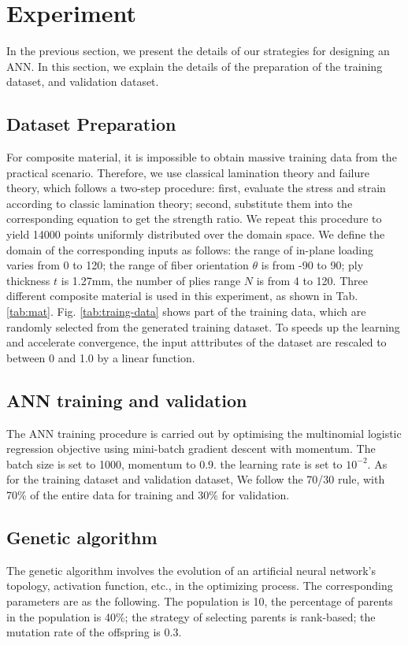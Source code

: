 \section{Experiment}
In the previous section, we present the details of our strategies for designing
an ANN. In this section, we explain the details of the preparation of the
training dataset, and validation dataset.
\subsection{Dataset Preparation}
For composite material, it is impossible to obtain massive training data from
the practical scenario. Therefore, we use classical lamination theory and
failure theory, which follows a two-step procedure: first, evaluate the stress
and strain according to classic lamination theory; second, substitute them into
the corresponding equation to get the strength ratio. We repeat this procedure
to yield 14000 points uniformly distributed over the domain space. We define
the domain of the corresponding inputs as follows: the range of in-plane
loading varies from 0 to 120; the range of fiber orientation $\theta$ is from
-90 to 90; ply thickness $t$ is 1.27mm, the number of plies range $N$ is from 4
to 120. Three different composite material is used in this experiment, as shown
in Tab. \ref{tab:mat}. Fig. \ref{tab:traing-data} shows part of the training
data, which are randomly selected from the generated training dataset.  To
speeds up the learning and accelerate convergence, the input atttributes of the
dataset are rescaled to between 0 and 1.0 by a linear function.



\subsection{ANN training and validation}
The ANN training procedure is carried out by optimising the multinomial
logistic regression objective using mini-batch gradient
descent\cite{lecun1989backpropagation} with momentum. The batch size is set to
1000, momentum to 0.9. the learning rate is set to $10^{-2}$. As for the
training dataset and validation dataset, We follow the 70/30 rule, with 70\% of
the entire data for training and 30\% for validation.

\subsection{Genetic algorithm}
The genetic algorithm involves the evolution of an artificial neural network’s
topology, activation function, etc., in the optimizing process.  The
corresponding parameters are as the following. The population is 10, the
percentage of parents in the population is 40\%; the strategy of selecting
parents is rank-based; the mutation rate of the offspring is 0.3.


